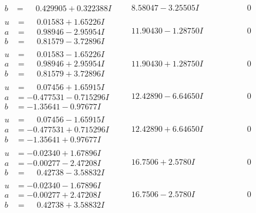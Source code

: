 \documentclass[1p]{elsarticle_modified}
\theoremstyle{definition}
\begin{document}
$$\begin{array}{c|c|c}
\begin{aligned}
b &= \phantom{-}0.429905 + 0.322388 I\end{aligned}
 & \phantom{-}8.58047 - 3.25505 I & \phantom{-0.000000 } 0 \\ \hline\begin{aligned}
u &= \phantom{-}0.01583 + 1.65226 I \\
a &= \phantom{-}0.98946 - 2.95954 I \\
b &= \phantom{-}0.81579 - 3.72896 I\end{aligned}
 & \phantom{-}11.90430 - 1.28750 I & \phantom{-0.000000 } 0 \\ \hline\begin{aligned}
u &= \phantom{-}0.01583 - 1.65226 I \\
a &= \phantom{-}0.98946 + 2.95954 I \\
b &= \phantom{-}0.81579 + 3.72896 I\end{aligned}
 & \phantom{-}11.90430 + 1.28750 I & \phantom{-0.000000 } 0 \\ \hline\begin{aligned}
u &= \phantom{-}0.07456 + 1.65915 I \\
a &= -0.477531 - 0.715296 I \\
b &= -1.35641 - 0.97677 I\end{aligned}
 & \phantom{-}12.42890 - 6.64650 I & \phantom{-0.000000 } 0 \\ \hline\begin{aligned}
u &= \phantom{-}0.07456 - 1.65915 I \\
a &= -0.477531 + 0.715296 I \\
b &= -1.35641 + 0.97677 I\end{aligned}
 & \phantom{-}12.42890 + 6.64650 I & \phantom{-0.000000 } 0 \\ \hline\begin{aligned}
u &= -0.02340 + 1.67896 I \\
a &= -0.00277 - 2.47208 I \\
b &= \phantom{-}0.42738 - 3.58832 I\end{aligned}
 & \phantom{-}16.7506 + 2.5780 I & \phantom{-0.000000 } 0 \\ \hline\begin{aligned}
u &= -0.02340 - 1.67896 I \\
a &= -0.00277 + 2.47208 I \\
b &= \phantom{-}0.42738 + 3.58832 I\end{aligned}
 & \phantom{-}16.7506 - 2.5780 I & \phantom{-0.000000 } 0 \\ \hline\begin{aligned}

\end{aligned}
\end{array}$$
\end{document}
